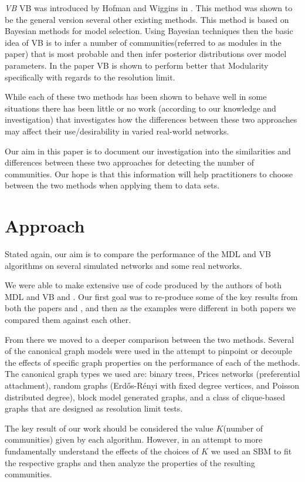 \documentclass[twocolumn,twoside]{IEEEtran}
\begin{document}
\emph{VB} VB was introduced by Hofman and Wiggins in \cite{Hofman2008}. This
method was shown to be the general version several other existing methods.
This method is based on Bayesian methods for model selection. Using Bayesian
techniques then the basic idea of VB is to infer a number of
communities(referred to as modules in the paper) that is most probable and then
infer posterior distributions over model parameters. In the paper VB is shown
to perform better that Modularity specifically with regards to the resolution
limit.

While each of these two methods has been shown to behave well in some
situations there has been little or no work (according to our knowledge and
investigation) that investigates how the differences between these two
approaches may affect their use/desirability in varied real-world networks.

Our aim in this paper is to document our investigation into the similarities
and differences between these two approaches for detecting the number of
communities. Our hope is that this information will help practitioners to
choose between the two methods when applying them to data sets.

\section*{Approach}\label{sec:Approach} Stated again, our aim is to compare the
performance of the MDL and VB algorithms on several simulated networks and some
real networks.

We were able to make extensive use of code produced by the authors of both MDL
and VB \cite{peixoto_graph-tool_2014} and \cite{Hofman_python_2008}. Our first
goal was to re-produce some of the key results from both the papers
\cite{Peixoto2013} and \cite{Hofman2008}, and then as the examples were
different in both papers we compared them against each other.

From there we moved to a deeper comparison between the two methods. Several of
the canonical graph models were used in the attempt to pinpoint or decouple
the effects of specific graph properties on the performance of each of the
methods. The canonical graph types we used are: binary trees, Prices networks
(preferential attachment), random graphs (Erd\H{o}s-R\'{e}nyi with fixed degree
vertices, and Poisson distributed degree), block model generated graphs, and a
class of clique-based graphs that are designed as resolution limit tests.

The key result of our work should be considered the value $K$(number of
communities) given by each algorithm. However, in an attempt to more
fundamentally understand the effects of the choices of $K$ we used an SBM to
fit the respective graphs and then analyze the properties of the resulting
communities.
\end{document}
